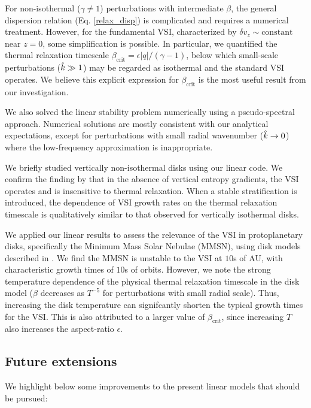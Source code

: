 For non-isothermal ($\gamma\neq1$) perturbations with intermediate
$\beta$, the general dispersion relation
(Eq. \ref{relax_disp}) is complicated and requires a numerical
treatment. However, for the fundamental VSI, characterized by  $\delta
v_z\sim\mathrm{constant}$ near $z=0$, some simplification is
possible. In particular, we quantified the thermal relaxation
timescale $\beta_\mathrm{crit}=\epsilon|q|/(\gamma-1)$, below
which small-scale perturbations ($\hat{k}\gg 1$) may be regarded as isothermal
and the standard VSI operates. We believe this explicit expression for
$\beta_\mathrm{crit}$ is the most useful result from our
investigation. 

We also solved the linear stability problem numerically using a
pseudo-spectral approach. Numerical solutions are mostly consistent
with our analytical expectations, except for perturbations with small
radial wavenumber ($\hat{k}\to0$) where the low-frequency approximation
is inappropriate.  

We briefly studied vertically non-isothermal disks using our linear
code. We confirm the finding by \cite{nelson13} that in the absence
of vertical entropy gradients, the VSI operates and is insensitive to thermal relaxation. When a
stable stratification is introduced, the dependence of VSI growth
rates on the thermal relaxation timescale is qualitatively similar to
that observed for vertically isothermal disks. 


We applied our linear results to assess the relevance of the VSI in
protoplanetary disks, specifically the Minimum Mass Solar Nebulae (MMSN),
using disk models described in \cite{chiang10}. We find the MMSN is
unstable to the VSI at $10$s of AU, with characteristic
growth times of $10$s of orbits. However, we note the strong
temperature dependence of the physical thermal relaxation timescale
in the disk model ($\beta$ decreases as $T^{-5}$ for perturbations with small
radial scale). Thus, increasing the disk temperature can signifcantly 
shorten the typical growth times for the VSI. This is also attributed
to a larger value of $\beta_\mathrm{crit}$, since increasing $T$ also
increases the aspect-ratio $\epsilon$. 

\subsection{Future extensions} 
We highlight below some improvements to the present  
linear models that should be pursued:

